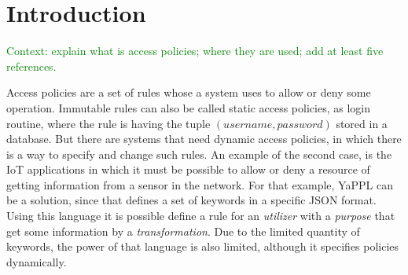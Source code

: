 \documentclass[sigplan,screen,anonymous,review]{acmart}\settopmatter{printfolios=true,printccs=false,printacmref=false}
\newcommand{\fer}[1]{\textcolor{green}{#1}}
\begin{document}


\maketitle


\section{Introduction}
\label{sec:intro}

\fer{Context: explain what is access policies; where they are used; add at least five references.}

Access policies are a set of rules whose a system uses to allow or deny some
operation.
Immutable rules can also be called static access policies, as login routine,
where the rule is having the tuple $(username, password)$ stored in a database.
But there are systems that need dynamic access policies, in which there is a
way to specify and change such rules.
An example of the second case, is the IoT applications in which it must be
possible to allow or deny a resource of getting information from a sensor in
the network.
For that example, YaPPL\cite{} can be a solution, since that defines a set of
keywords in a specific JSON format.
Using this language it is possible define a rule for an \textit{utilizer}
with a \textit{purpose} that get some information by a \textit{transformation}.
Due to the limited quantity of keywords, the power of that language is also
limited, although it specifies policies dynamically.




\end{document}
